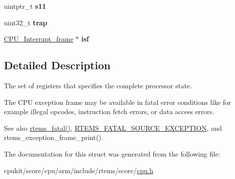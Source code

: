 \begin{DoxyCompactItemize}
\mbox{\label{structCPU__Exception__frame_a9975d1c427c145796de8dc46f9a995d3}} 
uintptr\+\_\+t {\bfseries s11}
\item 
\mbox{\label{structCPU__Exception__frame_a9b00746841c7407d16088bb78eb70a96}} 
uint32\+\_\+t {\bfseries trap}
\item 
\mbox{\label{structCPU__Exception__frame_a90afb2ce047eb405a1be8b826d975dc2}} 
\mbox{\hyperlink{structCPU__Interrupt__frame}{C\+P\+U\+\_\+\+Interrupt\+\_\+frame}} $\ast$ {\bfseries isf}
\end{DoxyCompactItemize}


\subsection{Detailed Description}
The set of registers that specifies the complete processor state. 

The C\+PU exception frame may be available in fatal error conditions like for example illegal opcodes, instruction fetch errors, or data access errors.

\begin{DoxySeeAlso}{See also}
\mbox{\hyperlink{group__ClassicFatal_ga53fa9338246642e0d931f61314c6609e}{rtems\+\_\+fatal()}}, \mbox{\hyperlink{group__RTEMSScoreIntErr_gga878b4de77df7d0b83d19609d4de42c26a131fe6aad46a1394f8bb0f2a5f19fa05}{R\+T\+E\+M\+S\+\_\+\+F\+A\+T\+A\+L\+\_\+\+S\+O\+U\+R\+C\+E\+\_\+\+E\+X\+C\+E\+P\+T\+I\+ON}}, and rtems\+\_\+exception\+\_\+frame\+\_\+print(). 
\end{DoxySeeAlso}


The documentation for this struct was generated from the following file\+:\begin{DoxyCompactItemize}
\item 
cpukit/score/cpu/arm/include/rtems/score/\mbox{\hyperlink{arm_2include_2rtems_2score_2cpu_8h}{cpu.\+h}}\end{DoxyCompactItemize}
